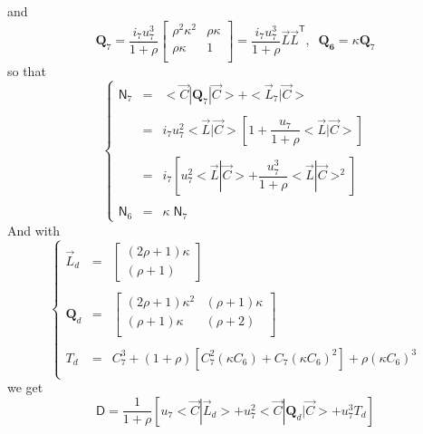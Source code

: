 \documentclass[aps,onecolumn,11pt]{revtex4}
\newcommand{\mytrn}[1]{{#1}^{\!\mathsf{T}}}
\newcommand{\mymat}[1]{{\bm{#1}}}
\begin{document}
and
\begin{equation}
\mymat{Q}_7 = \dfrac{i_7 u_7^3}{1+\rho}
\begin{bmatrix}
	\rho^2 \kappa^2 & \rho\kappa \\
	\rho\kappa      & 1\\
\end{bmatrix}
= \dfrac{i_7 u_7^3}{1+\rho} \vec{L} \mytrn{\vec{L}},\;\; \mymat{Q_6} = \kappa \mymat{Q}_7
\end{equation}
so that
\begin{equation}
\left\lbrace
\begin{array}{rcl}
\mathsf{N}_7 & = & <\vec{C}|\mymat{Q}_7|\vec{C}> + <\vec{L}_7|\vec{C}> \\
\\
 & = & i_7 u_7^2  <\vec{L}|\vec{C}> \left[ 1 + \dfrac{u_7}{1+\rho}  <\vec{L}|\vec{C}> \right]\\
 \\
 & = & i_7 \left[  u_7^2  <\vec{L}|\vec{C}> + \dfrac{u_7^3}{1+\rho} <\vec{L}|\vec{C}>^2 \right]\\
 \\
\mathsf{N}_6 & = & \kappa \; \mathsf{N}_7
\end{array} 
\right.
\end{equation}
And with
\begin{equation}
\left\lbrace
\begin{array}{rcl}
\vec{L}_d & = &
\begin{bmatrix}
(2\rho+1) \kappa\\
(\rho+1)
\end{bmatrix}\\
\\
\mymat{Q}_d & =  &
\begin{bmatrix}
(2\rho+1)\kappa^2 & (\rho+1)\kappa \\
(\rho+1) \kappa   & (\rho+2)  \\
\end{bmatrix}\\
\\
T_d & = & C_7^3 + (1+\rho)[C_7^2(\kappa C_6)+C_7(\kappa C_6)^2] + \rho (\kappa C_6)^3 \\
\end{array}
\right.
\end{equation}
we get
\begin{equation}
	\mathsf{D} = \dfrac{1}{1+\rho} \left[ u_7 <\vec{C}|\vec{L}_d> + u_7^2 <\vec{C}|\mymat{Q}_d|\vec{C}> + u_7^3 T_d \right]
\end{equation}
\end{document}
